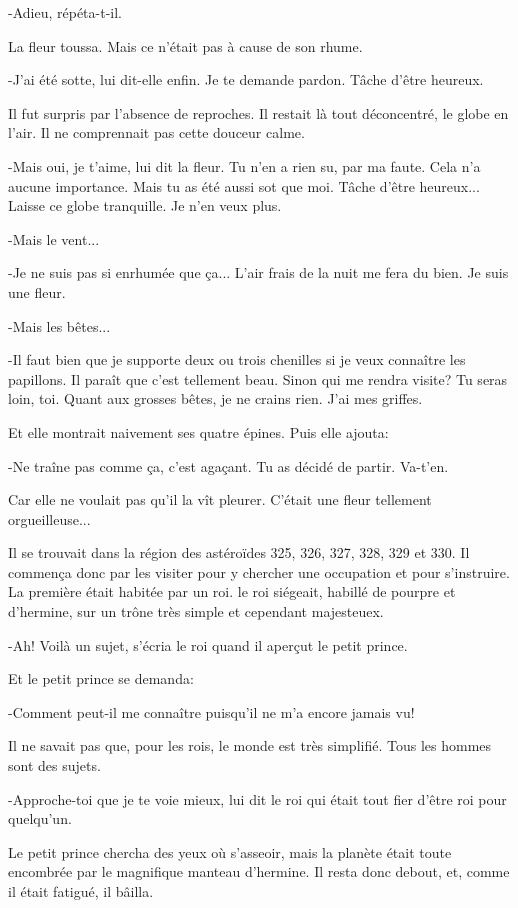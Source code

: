 \documentclass{report}
\begin{document}
-Adieu, répéta-t-il.

La fleur toussa. Mais ce n'était pas à cause de son rhume.

-J'ai été sotte, lui dit-elle enfin. Je te demande pardon. Tâche d'être heureux.

Il fut surpris par l'absence de reproches. Il restait là tout déconcentré, le globe en l'air. Il ne comprennait pas cette douceur calme.

-Mais oui, je t'aime, lui dit la fleur. Tu n'en a rien su, par ma faute. Cela n'a aucune importance. Mais tu as été aussi sot que moi. Tâche d'être heureux... Laisse ce globe tranquille. Je n'en veux plus.

-Mais le vent...

-Je ne suis pas si enrhumée que ça... L'air frais de la nuit me fera du bien. Je suis une fleur.

-Mais les bêtes...

-Il faut bien que je supporte deux ou trois chenilles si je veux connaître les papillons. Il paraît que c'est tellement beau. Sinon qui me rendra visite? Tu seras loin, toi. Quant aux grosses bêtes, je ne crains rien. J'ai mes griffes.

Et elle montrait naivement ses quatre épines. Puis elle ajouta:

-Ne traîne pas comme ça, c'est agaçant. Tu as décidé de partir. Va-t'en.

Car elle ne voulait pas qu'il la vît pleurer. C'était une fleur tellement orgueilleuse...

\parachapter{} %
Il se trouvait dans la région des astéroïdes 325, 326, 327, 328, 329 et 330. Il commença donc par les visiter pour y chercher une occupation et pour s'instruire.
La première était habitée par un roi. le roi siégeait, habillé de pourpre et d'hermine, sur un trône très simple et cependant majesteuex.

-Ah! Voilà un sujet, s'écria le roi quand il aperçut le petit prince.

Et le petit prince se demanda:

-Comment peut-il me connaître puisqu'il ne m'a encore jamais vu!

Il ne savait pas que, pour les rois, le monde est très simplifié. Tous les hommes sont des sujets.

-Approche-toi que je te voie mieux, lui dit le roi qui était tout fier d'être roi pour quelqu'un.


Le petit prince chercha des yeux où s'asseoir, mais la planète était toute encombrée par le magnifique manteau d'hermine. Il resta donc debout, et, comme il était fatigué, il bâilla.
\end{document}
